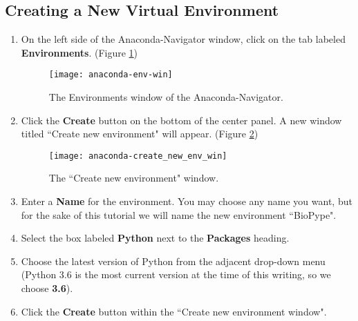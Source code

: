 \subsection{Creating a New Virtual Environment}
    \begin{enumerate}
        \item On the left side of the Anaconda-Navigator window, click on the tab labeled \textbf{Environments}. (Figure \ref{anaconda-env-win}) 
        \begin{figure}
            \texttt{[image: anaconda-env-win]}
            \caption{The Environments window of the Anaconda-Navigator.}
            \label{anaconda-env-win}
        \end{figure}
        \item Click the \textbf{Create} button on the bottom of the center panel. A new window titled ``Create new environment" will appear. (Figure \ref{anaconda-create-new-env-win})
        \begin{figure}[b]
            \begin{center}
            \texttt{[image: anaconda-create\_new\_env\_win]}
            \caption{The ``Create new environment" window.}
            \label{anaconda-create-new-env-win}
            \end{center}
        \end{figure}
        \item Enter a \textbf{Name} for the environment. You may choose any name you want, but for the sake of this tutorial we will name the new environment ``BioPype".
        \item Select the box labeled \textbf{Python} next to the \textbf{Packages} heading.
        \item Choose the latest version of Python from the adjacent drop-down menu (Python 3.6 is the most current version at the time of this writing, so we choose \textbf{3.6}).
        \item Click the \textbf{Create} button within the ``Create new environment window".
    \end{enumerate}

